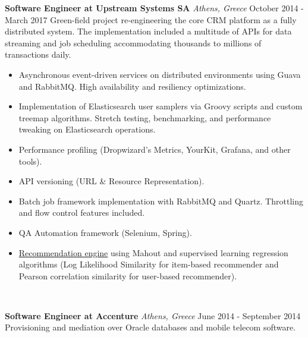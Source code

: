 \documentclass{article}
\begin{document}
        \begin{flushleft}
            \textbf{\large Software Engineer at Upstream Systems SA} \textit{\footnotesize Athens, Greece} \hfill \small October 2014 - March 2017   \newline 
		Green-field project re-engineering the core CRM platform as a fully distributed system. The implementation included a multitude of APIs for data streaming and job scheduling accommodating thousands to millions of transactions daily. 
            \newline
            \begin{itemize}
                \item Asynchronous event-driven services on distributed environments using Guava and RabbitMQ. High availability and resiliency optimizations.
			\item Implementation of Elasticsearch user samplers via Groovy scripts and custom treemap algorithms. Stretch testing, benchmarking, and performance tweaking on Elasticsearch operations.
			\item Performance profiling (Dropwizard’s Metrics, YourKit, Grafana, and other tools).
			\item API versioning (URL \& Resource Representation).
			\item Batch job framework implementation with RabbitMQ and Quartz. Throttling and flow control features included.
                \item QA Automation framework (Selenium, Spring).
			\item \href{https://github.com/tonyflow/recommender}{Recommendation engine} using Mahout and supervised learning regression algorithms (Log Likelihood Similarity for item-based recommender and Pearson correlation similarity for user-based recommender).
            \end{itemize}
		                           \\ [1ex]
        \end{flushleft}

        \begin{flushleft}
            \textbf{\large Software Engineer at Accenture} \textit{\footnotesize Athens, Greece} \hfill \small June 2014 - September 2014  \newline
		Provisioning and mediation over Oracle databases and mobile telecom software. \newline
		   \\ [1ex]
        \end{flushleft}
\end{document}
